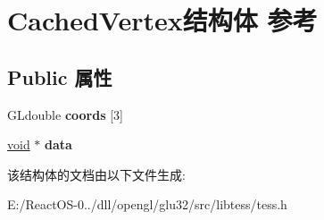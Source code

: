 \hypertarget{struct_cached_vertex}{}\section{Cached\+Vertex结构体 参考}
\label{struct_cached_vertex}
\subsection*{Public 属性}
\begin{DoxyCompactItemize}
\item 
\mbox{\label{struct_cached_vertex_a9aec09ba7cf00c2b8575fd4a790dbd73}} 
G\+Ldouble {\bfseries coords} \mbox{[}3\mbox{]}
\item 
\mbox{\label{struct_cached_vertex_a7a4457c8f11877e2d71138afc41bb20e}} 
\hyperlink{interfacevoid}{void} $\ast$ {\bfseries data}
\end{DoxyCompactItemize}


该结构体的文档由以下文件生成\+:\begin{DoxyCompactItemize}
\item 
E\+:/\+React\+O\+S-\/0../dll/opengl/glu32/src/libtess/tess.\+h\end{DoxyCompactItemize}
